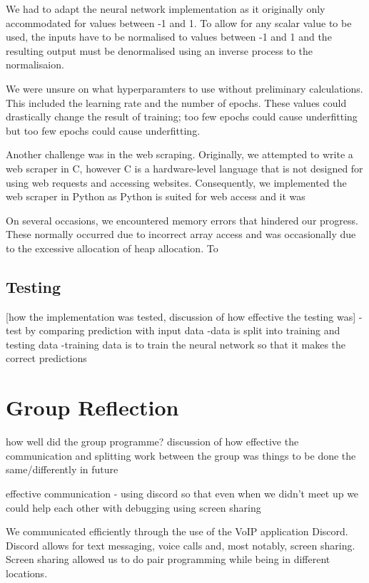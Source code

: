 \documentclass[11pt]{article}
\begin{document}
We had to adapt the neural network implementation as it originally only accommodated for values between -1 and 1.
To allow for any scalar value to be used, the inputs have to be normalised to values between -1 and 1 
and the resulting output must be denormalised using an inverse process to the normalisaion.

We were unsure on what hyperparamters to use without preliminary calculations.
This included the learning rate and the number of epochs. 
These values could drastically change the result of training; too few epochs could cause underfitting 
but too few epochs could cause underfitting.

Another challenge was in the web scraping. 
Originally, we attempted to write a web scraper in C, 
however C is a hardware-level language that is not designed for using web requests and 
accessing websites. Consequently, we implemented the web scraper in Python as
Python is suited for web access and it was


On several occasions, we encountered memory errors that hindered our progress. 
These normally occurred due to incorrect array access and was occasionally due to the excessive allocation of heap allocation.
To  


\subsection{Testing}
[how the implementation was tested, discussion of how effective the testing was]
-test by comparing prediction with input data
-data is split into training and testing data
-training data is to train the neural network so that it makes the correct predictions


\section{Group Reflection}
how well did the group programme? 
discussion of how effective the communication and splitting work between the group was
things to be done the same/differently in future

effective communication - using discord so that even when we didn't meet up we could help each other with debugging using screen sharing

We communicated efficiently through the use of the VoIP application Discord. 
Discord allows for text messaging, voice calls and, most notably, screen sharing.
Screen sharing allowed us to do pair programming while being in different locations.
\end{document}
